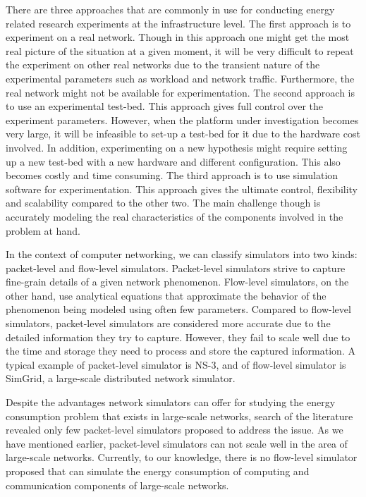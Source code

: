 There are three approaches that are commonly in use for conducting energy related research experiments at the infrastructure level. The first approach is to experiment on a real network. Though in this approach one might get the most real picture of the situation at a given moment, it will be very difficult to repeat the experiment on other real networks due to the transient nature of the experimental parameters such as workload and network traffic.  Furthermore, the real network might not be available for experimentation. The second approach is to use an experimental test-bed. This approach gives full control over the experiment parameters. However, when the platform under investigation becomes very large, it will be infeasible to set-up a test-bed for it due to the hardware cost involved. In addition, experimenting on a new hypothesis might require setting up a new test-bed with a new hardware and different configuration. This also becomes costly and time consuming. The third approach is to use simulation software for experimentation. This approach gives the ultimate control, flexibility and scalability compared to the other two. The main challenge though is accurately modeling the real characteristics of the components involved in the problem at hand.

In the context of computer networking, we can classify simulators into two kinds: packet-level and flow-level simulators. Packet-level simulators strive to capture fine-grain details of a given network phenomenon. Flow-level simulators, on the other hand, use analytical equations that approximate the behavior of the phenomenon being modeled using often few parameters. Compared to flow-level simulators, packet-level simulators are considered more accurate due to the detailed information they try to capture. However, they fail to scale well due to the time and storage they need to process and store the captured information. A typical example of packet-level simulator is NS-3, and of flow-level simulator is SimGrid, a large-scale distributed network simulator. 

Despite the advantages network simulators can offer for studying the energy consumption problem that exists in large-scale networks, search of the literature revealed only few packet-level simulators proposed to address the issue. As we have mentioned earlier, packet-level simulators can not scale well in the area of large-scale networks. Currently, to our knowledge, there is no flow-level simulator proposed that can simulate the energy consumption of computing and communication components of large-scale networks. 


